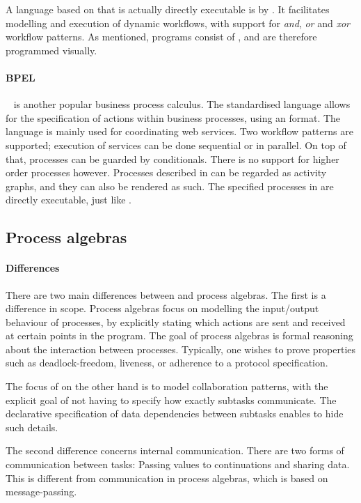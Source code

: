 A language based on \WFN that is actually directly executable is \YAWL by \citet{DBLP:journals/is/AalstH05}.
It facilitates modelling and execution of dynamic workflows, with support for \emph{and}, \emph{or} and \emph{xor} workflow patterns.
As mentioned, \YAWL programs consist of \WFN, and are therefore programmed visually.

\paragraph{BPEL}

\BPEL~\cite{bpel} is another popular business process calculus. The standardised
language allows for the specification of actions within business processes,
using an \XML format.
The language is mainly used for coordinating web services.
Two workflow patterns are supported; execution of services can be done sequential or in parallel.
On top of that, processes can be guarded by conditionals.
There is no support for higher order processes however.
Processes described in \BPEL can be regarded as activity graphs, and they can also be rendered as such.
The specified processes in \BPEL are directly executable, just like \YAWL.



\subsection{Process algebras}

\paragraph{Differences}
There are two main differences between \TOP and process algebras.
The first is a difference in scope.
Process algebras focus on modelling the input/output behaviour of processes, by explicitly stating which actions are sent and received at certain points in the program.
The goal of process algebras is formal reasoning about the interaction between processes.
Typically, one wishes to prove properties such as deadlock-freedom, liveness, or adherence to a protocol specification.

The focus of \TOP on the other hand is to model collaboration patterns, with the explicit goal of not having to specify how exactly subtasks communicate.
The declarative specification of data dependencies between subtasks enables \TOP to hide such details.

The second difference concerns internal communication.
There are two forms of communication between tasks: Passing values to continuations and sharing data.
This is different from communication in process algebras, which is based on message-passing.


